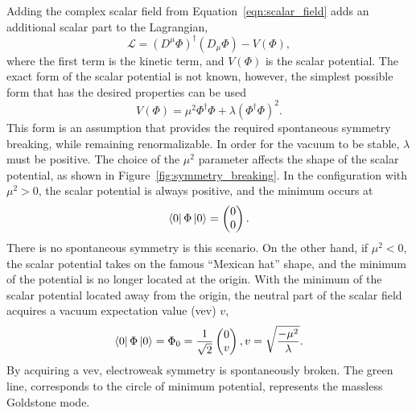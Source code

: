 Adding the complex scalar field from Equation~\ref{eqn:scalar_field} adds an
additional scalar part to the Lagrangian,
\begin{equation}
  \mathcal{L} =
  \left(D^{\mu}\Phi\right)^{\dagger}\left(D_{\mu}\Phi\right) - V(\Phi),
  \label{eqn:scalar_lagrangian}
\end{equation}
where the first term is the kinetic term, and $V(\Phi)$ is the scalar
potential.
The exact form of the scalar potential is not known, however, the simplest
possible form that has the desired properties can be used
\begin{equation}
  V(\Phi) = \mu^2 \Phi^{\dagger}\Phi + \lambda\left(\Phi^{\dagger}\Phi\right)^2.
\end{equation}
This form is an assumption that provides the required spontaneous symmetry
breaking, while remaining renormalizable.
In order for the vacuum to be stable, $\lambda$ must be positive.
The choice of the $\mu^2$ parameter affects the shape of the scalar potential,
as shown in Figure~\ref{fig:symmetry_breaking}.
In the configuration with $\mu^2 > 0$, the scalar potential is always positive,
and the minimum occurs at
\begin{equation}
  \bra{0} \Phi \ket{0} = \begin{pmatrix} 0 \\ 0 \end{pmatrix}.
\end{equation}
There is no spontaneous symmetry is this scenario.
On the other hand, if $\mu^2 < 0$, the scalar potential takes on the famous
``Mexican hat'' shape, and the minimum of the potential is no longer located at
the origin.
With the minimum of the scalar potential located away from the origin, the
neutral part of the scalar field acquires a vacuum expectation value (vev) $v$,
\begin{equation}
  \bra{0} \Phi \ket{0} =
  \Phi_0 =
  \frac{1}{\sqrt{2}} \begin{pmatrix} 0 \\ v \end{pmatrix},
  v = \sqrt{\frac{-\mu^2}{\lambda}}.
\end{equation}
By acquiring a vev, electroweak symmetry is spontaneously broken.
The green line, corresponds to the circle of minimum potential,
represents the massless Goldstone mode.

